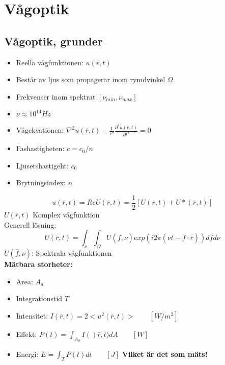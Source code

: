 \documentclass{article}
\begin{document}
  \section{Vågoptik}
  \subsection{Vågoptik, grunder}
  \begin{itemize}
    \item Reella vågfunktionen: $u(\bar{r},t)$
    \item Består av ljus som propagerar inom rymdvinkel $\Omega$
    \item Frekvenser inom spektrat $[\nu_{min},\nu_{max}]$
    \item $\nu\approx 10^{14}Hz$
    \item Vågekvationen: $\nabla^2u(\bar{r},t)-\frac{1}{c^2}\frac{\partial^2u(\bar{r},t)}{\partial t^2}=0$
    \item Fashastigheten: $c=c_0/n$
    \item Ljusetshastigeht: $c_0$
    \item Brytningsindex: $n$
  \end{itemize}

  \begin{equation}
    u(\bar{r},t)=Re{U(\bar{r},t)}=\frac{1}{2}[U(\bar{r},t)+U*(\bar{r},t)]
  \end{equation}
  $U(\bar{r},t)$ Komplex vågfunktion\\

  Generell lösning:
  \begin{equation}
    U(\bar{r},t)=\int_{\nu}\int_{\Omega}U(\bar{f},\nu)exp(i2\pi(\nu t-\bar{f}\cdot\bar{r}))d\bar{f}d{\nu}
  \end{equation}
  $U(\bar{f},\nu)$: Spektrala vågfunktionen\\

  \textbf{Mätbara storheter:}
  \begin{itemize}
    \item Area: $A_d$
    \item Integrationstid $T$
    \item Intensitet: $ I(\bar{r},t) = 2<u^2(\bar{r},t)>\qquad[W/m^2]$
    \item Effekt: $P(t) = \int_{A_d}I()\bar{r},t)dA\qquad[W]$
    \item Energi: $E = \int_TP(t)dt\qquad[J]$ \quad\textbf{Vilket är det som mäts!}
  \end{itemize}
\end{document}
